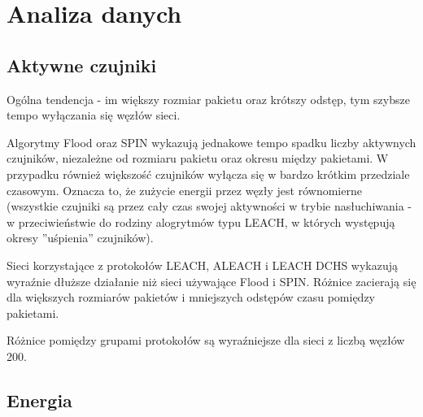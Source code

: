 \section{Analiza danych}
\subsection{Aktywne czujniki}
Ogólna tendencja - im większy rozmiar pakietu oraz krótszy odstęp, tym  szybsze tempo wyłączania się węzłów sieci.

Algorytmy Flood oraz SPIN wykazują jednakowe tempo spadku liczby aktywnych czujników, niezależne od rozmiaru pakietu oraz okresu między pakietami. W przypadku również większość czujników wyłącza się w bardzo krótkim przedziale czasowym. Oznacza to, że zużycie energii przez węzły jest równomierne (wszystkie czujniki są przez cały czas swojej aktywności w trybie nasłuchiwania - w przeciwieństwie do rodziny alogrytmów typu LEACH, w których występują okresy ''uśpienia'' czujników).

Sieci korzystające z protokołów LEACH, ALEACH i LEACH DCHS wykazują wyraźnie dłuższe działanie niż sieci używające Flood i SPIN.
Różnice zacierają się dla większych rozmiarów pakietów i mniejszych odstępów czasu pomiędzy pakietami.

Różnice pomiędzy grupami protokołów są wyraźniejsze dla sieci z liczbą węzłów 200.










\subsection{Energia}








